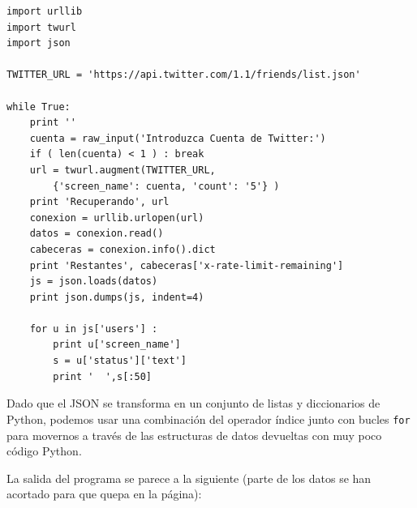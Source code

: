 \beforeverb
\begin{verbatim}
import urllib
import twurl
import json

TWITTER_URL = 'https://api.twitter.com/1.1/friends/list.json'

while True:
    print ''
    cuenta = raw_input('Introduzca Cuenta de Twitter:')
    if ( len(cuenta) < 1 ) : break
    url = twurl.augment(TWITTER_URL,
        {'screen_name': cuenta, 'count': '5'} )
    print 'Recuperando', url
    conexion = urllib.urlopen(url)
    datos = conexion.read()
    cabeceras = conexion.info().dict
    print 'Restantes', cabeceras['x-rate-limit-remaining']
    js = json.loads(datos)
    print json.dumps(js, indent=4)

    for u in js['users'] :
        print u['screen_name']
        s = u['status']['text']
        print '  ',s[:50]
\end{verbatim}
\afterverb
%
Dado que el JSON se transforma en un conjunto de listas y diccionarios de Python,
podemos usar una combinación del operador índice junto con bucles {\tt for} para
movernos a través de las estructuras de datos devueltas con muy poco
código Python.

La salida del programa se parece a la siguiente (parte de los datos
se han acortado para que quepa en la página):

